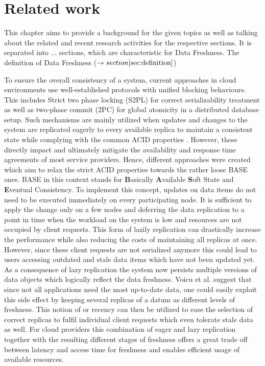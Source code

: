 
\chapter{Related work}
\label{c:related}

This chapter aims to provide a background for the given topics as well as talking about the related and recent research activities for the respective sections.
It is separated into ... sections, which are characteristic for Data Freshness.
The definition of Data Freshness ($\rightarrow section \ref{sec:definition}$)

To ensure the overall consistency of a system, current approaches in cloud environments use well-established protocols with unified blocking behaviours. 
This includes Strict two phase locking (S2PL) for correct serializability treatment as well as two-phase commit (2PC) for global atomicity in a distributed database 
setup. Such mechanisms are mainly utilized when updates and changes to the system are replicated eagerly to every available replica to maintain a consistent state
while complying with the common ACID properties \cite{tamer:2005}.
However, these  directly impact and ultimately mitigate the availability and response time agreements of most service providers.
Hence, different approaches were created which aim to relax the strict ACID properties towards the rather loose BASE ones.
BASE in this context stands for \textbf{B}asically \textbf{A}vailable \textbf{S}oft State and \textbf{E}ventual Consistency\cite{shapiro:2011}.
To implement this concept, updates on data items do not need to be executed immediately on every participating node.
It is sufficient to apply the change only on a few nodes and deferring the data replication to a point in time when the workload on the system is low and 
resources are not occupied by client requests. This form of lazily replication can drastically increase the performance while also reducing the costs of maintaining
all replicas at once. However, since these client requests are not serialized anymore this could lead to users accessing outdated and stale data items
which have not been updated yet.
As a consequence of lazy replication the system now persists multiple versions of data objects which logically reflect the data freshness.
Voicu et al. \cite{voicu:2010} suggest that since not all applications need the most up-to-date data, one could easily exploit 
this side effect by keeping several replicas of a datum as different levels of freshness.
This notion of or recency can then be utilized to ease the selection of correct replicas to fulfil individual client requests which even tolerate stale data as well.
For cloud providers this combination of eager and lazy replication together with the resulting different stages of freshness 
offers a great trade off between latency and access time for freshness and enables efficient usage of available resources.



